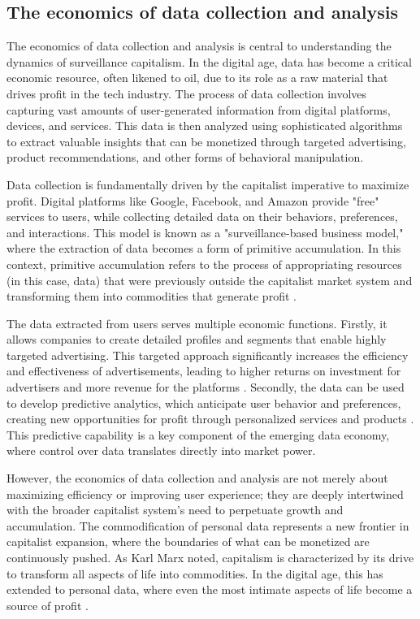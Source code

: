 \subsection{The economics of data collection and analysis}

The economics of data collection and analysis is central to understanding the dynamics of surveillance capitalism. In the digital age, data has become a critical economic resource, often likened to oil, due to its role as a raw material that drives profit in the tech industry. The process of data collection involves capturing vast amounts of user-generated information from digital platforms, devices, and services. This data is then analyzed using sophisticated algorithms to extract valuable insights that can be monetized through targeted advertising, product recommendations, and other forms of behavioral manipulation.

Data collection is fundamentally driven by the capitalist imperative to maximize profit. Digital platforms like Google, Facebook, and Amazon provide "free" services to users, while collecting detailed data on their behaviors, preferences, and interactions. This model is known as a "surveillance-based business model," where the extraction of data becomes a form of primitive accumulation. In this context, primitive accumulation refers to the process of appropriating resources (in this case, data) that were previously outside the capitalist market system and transforming them into commodities that generate profit \cite[pp.~55-57]{harvey2010enigma}.

The data extracted from users serves multiple economic functions. Firstly, it allows companies to create detailed profiles and segments that enable highly targeted advertising. This targeted approach significantly increases the efficiency and effectiveness of advertisements, leading to higher returns on investment for advertisers and more revenue for the platforms \cite[pp.~113-115]{turow2011daily}. Secondly, the data can be used to develop predictive analytics, which anticipate user behavior and preferences, creating new opportunities for profit through personalized services and products \cite[pp.~89-91]{gandy1993panoptic}. This predictive capability is a key component of the emerging data economy, where control over data translates directly into market power.

However, the economics of data collection and analysis are not merely about maximizing efficiency or improving user experience; they are deeply intertwined with the broader capitalist system's need to perpetuate growth and accumulation. The commodification of personal data represents a new frontier in capitalist expansion, where the boundaries of what can be monetized are continuously pushed. As Karl Marx noted, capitalism is characterized by its drive to transform all aspects of life into commodities. In the digital age, this has extended to personal data, where even the most intimate aspects of life become a source of profit \cite[pp.~714-717]{marx1867capital}.

